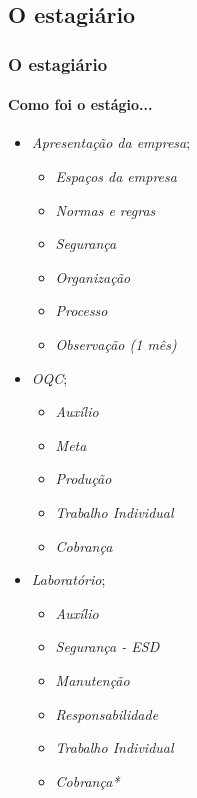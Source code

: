 \documentclass[aspectratio=169]{beamer}
\begin{document}
	\subsection{O estagiário}
	\begin{frame}
		\frametitle{O estagiário}
		\framesubtitle{Como foi o estágio...}
		
		\begin{minipage}[H]{.3\textwidth}
			\begin{itemize}
				\item \textit{Apresentação da empresa};
				\begin{itemize}
					\item \textit{Espaços da empresa}
					\item \textit{Normas e regras}
					\item \textit{Segurança}
					\item \textit{Organização}
					\item \textit{Processo}
					\item \textit{Observação (1 mês)}
				\end{itemize}
			\end{itemize}
		\end{minipage}
		\hfill
		\begin{minipage}[H]{.3\textwidth}
			\begin{itemize}
				\item \textit{OQC};
				\begin{itemize}
					\item \textit{Auxílio}
					\item \textit{Meta}
					\item \textit{Produção}
					\item \textit{Trabalho Individual}
					\item \textit{Cobrança}
				\end{itemize}
			\end{itemize}
		\end{minipage}
		\hfill
		\begin{minipage}[H]{.3\textwidth}
			\begin{itemize}
				\item \textit{Laboratório};
				\begin{itemize}
					\item \textit{Auxílio}
					\item \textit{Segurança - ESD}
					\item \textit{Manutenção}
					\item \textit{Responsabilidade}
					\item \textit{Trabalho Individual}
					\item \textit{Cobrança*}
				\end{itemize}
			\end{itemize}
		\end{minipage}
	\end{frame}
	
\end{document}
